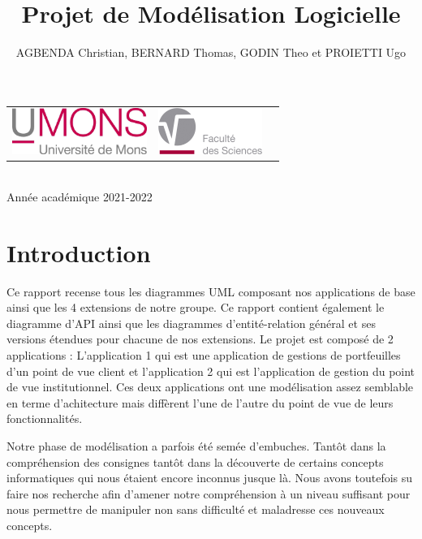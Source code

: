\documentclass{article}
\begin{document}
\begin{titlepage}
\begin{center}
        \begin{center}
            \begin{tabular}[t]{c c c}
                \includegraphics[height=1.5cm]{ressources/logoumons.jpg} &
                \includegraphics[height=1.5cm]{ressources/logofs.jpg} &
            \end{tabular}
        \end{center}~\\
        
        {\large Année académique 2021-2022}
        
    \end{center}
\end{titlepage}

\title{Projet de Modélisation Logicielle}
\author{AGBENDA Christian, BERNARD Thomas, GODIN Theo et PROIETTI Ugo}
\maketitle
\tableofcontents
\newpage


\section{Introduction}
		Ce rapport recense tous les diagrammes UML composant nos applications de base ainsi que les 4 extensions de notre groupe. Ce rapport contient également le 
		diagramme d'API ainsi que les diagrammes d'entité-relation général et ses versions étendues pour chacune de nos extensions.  
		Le projet est composé de 2 applications : L'application 1 qui est une application de gestions de portfeuilles d'un point de vue client et l'application 2 qui 
		est l'application de gestion du point de vue institutionnel. Ces deux applications ont une modélisation assez semblable en terme d'achitecture mais diffèrent
		l'une de l'autre du point de vue de leurs fonctionnalités.
		\bigskip

		Notre phase de modélisation a parfois été semée d'embuches. Tantôt dans la compréhension des consignes tantôt dans la découverte de certains concepts informatiques
		qui nous étaient encore inconnus jusque là. Nous avons toutefois su faire nos recherche afin d'amener notre compréhension à un niveau suffisant pour nous permettre
		de manipuler non sans difficulté et maladresse ces nouveaux concepts.
\end{document}
